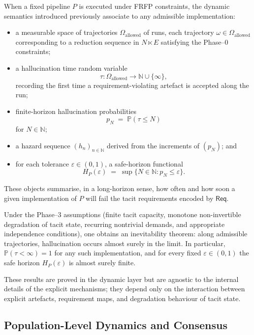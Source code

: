\documentclass[11pt]{article}
\theoremstyle{definition}
\newcommand{\Req}{\mathsf{Req}}
\begin{document}
When a fixed pipeline $P$ is executed under FRFP constraints, the dynamic semantics introduced previously associate to any admissible implementation:
\begin{itemize}
  \item a measurable space of trajectories $\Omega_{\mathrm{allowed}}$ of runs, each trajectory $\omega \in \Omega_{\mathrm{allowed}}$ corresponding to a reduction sequence in $N \ltimes E$ satisfying the Phase--0 constraints;
  \item a hallucination time random variable
    \[
      \tau : \Omega_{\mathrm{allowed}} \longrightarrow \mathbb{N} \cup \{\infty\},
    \]
    recording the first time a requirement-violating artefact is accepted along the run;
  \item finite-horizon hallucination probabilities
    \[
      p_N \;=\; \mathbb{P}(\tau \leq N)
    \]
    for $N \in \mathbb{N}$;
  \item a hazard sequence $(h_n)_{n \in \mathbb{N}}$ derived from the increments of $(p_N)$; and
  \item for each tolerance $\varepsilon \in (0,1)$, a safe-horizon functional
    \[
      H_P(\varepsilon) \;=\; \sup\{N \in \mathbb{N} : p_N \leq \varepsilon\}.
    \]
\end{itemize}
These objects summarise, in a long-horizon sense, how often and how soon a given implementation of $P$ will fail the tacit requirements encoded by $\Req$.

Under the Phase--3 assumptions (finite tacit capacity, monotone non-invertible degradation of tacit state, recurring nontrivial demands, and appropriate independence conditions), one obtains an inevitability theorem: along admissible trajectories, hallucination occurs almost surely in the limit. In particular, $\mathbb{P}(\tau < \infty) = 1$ for any such implementation, and for every fixed $\varepsilon \in (0,1)$ the safe horizon $H_P(\varepsilon)$ is almost surely finite.

These results are proved in the dynamic layer but are agnostic to the internal details of the explicit mechanisms; they depend only on the interaction between explicit artefacts, requirement maps, and degradation behaviour of tacit state.

\subsection{Population-Level Dynamics and Consensus}
\end{document}
